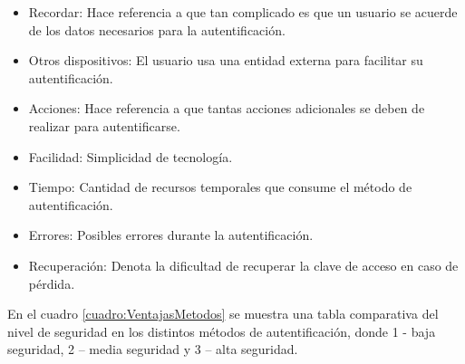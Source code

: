 \documentclass[12pt, a4paper, titlepage]{report}
\begin{document}
		\begin{itemize}
			\item Recordar: Hace referencia a que tan complicado es que un usuario se acuerde de los datos necesarios para la autentificaci\'on. 
			\item Otros dispositivos: El usuario usa una entidad externa para facilitar su autentificaci\'on.
			\item Acciones: Hace referencia a que tantas acciones adicionales se deben de realizar para autentificarse.
			\item Facilidad: Simplicidad de tecnología.
			\item Tiempo: Cantidad de recursos temporales que consume el método de autentificaci\'on.
			\item Errores: Posibles errores durante la autentificaci\'on. 
			\item Recuperación: Denota la dificultad de recuperar la clave de acceso en caso de pérdida.
		\end{itemize}
		
		En el cuadro \ref{cuadro:VentajasMetodos} se muestra una tabla comparativa del nivel de seguridad en los distintos métodos de autentificaci\'on, donde 1 - baja seguridad, 2 – media seguridad y 3 – alta seguridad.
		
\end{document}
